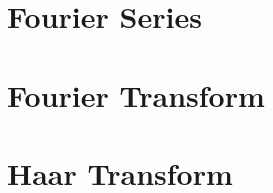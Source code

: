 
\makeindex



    

    \tableofcontents

    \chapter{Fourier Series}
	\label{ch:fs}

	
	
	
	
  

    \chapter{Fourier Transform}
    \label{ch:ft}
    


    \chapter{Haar Transform}
    \label{ch:ht}
    

    
    


